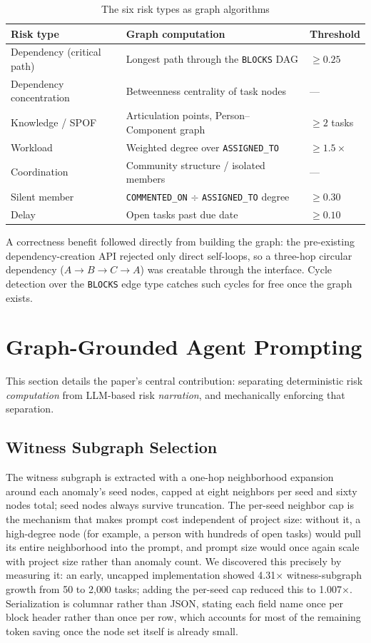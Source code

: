\documentclass[conference]{IEEEtran}
\begin{document}
\begin{table}[t]
\caption{The six risk types as graph algorithms}
\label{tab:risks}
\centering
\begin{tabular}{p{2.0cm}p{4.0cm}p{1.5cm}}
\toprule
\textbf{Risk type} & \textbf{Graph computation} & \textbf{Threshold} \\
\midrule
Dependency (critical path) & Longest path through the \texttt{BLOCKS} DAG & $\geq 0.25$ \\
Dependency concentration & Betweenness centrality of task nodes & --- \\
Knowledge / SPOF & Articulation points, Person--Component graph & $\geq 2$ tasks \\
Workload & Weighted degree over \texttt{ASSIGNED\_TO} & $\geq 1.5\times$ \\
Coordination & Community structure / isolated members & --- \\
Silent member & \texttt{COMMENTED\_ON} $\div$ \texttt{ASSIGNED\_TO} degree & $\geq 0.30$ \\
Delay & Open tasks past due date & $\geq 0.10$ \\
\bottomrule
\end{tabular}
\end{table}

A correctness benefit followed directly from building the graph: the pre-existing
dependency-creation API rejected only direct self-loops, so a three-hop circular
dependency ($A \to B \to C \to A$) was creatable through the interface. Cycle
detection over the \texttt{BLOCKS} edge type catches such cycles for free once the
graph exists.

\section{Graph-Grounded Agent Prompting}

This section details the paper's central contribution: separating deterministic risk
\emph{computation} from LLM-based risk \emph{narration}, and mechanically enforcing
that separation.

\subsection{Witness Subgraph Selection}

The witness subgraph is extracted with a one-hop neighborhood expansion around each
anomaly's seed nodes, capped at eight neighbors per seed and sixty nodes total; seed
nodes always survive truncation. The per-seed neighbor cap is the mechanism that
makes prompt cost independent of project size: without it, a high-degree node (for
example, a person with hundreds of open tasks) would pull its entire neighborhood
into the prompt, and prompt size would once again scale with project size rather than
anomaly count. We discovered this precisely by measuring it: an early, uncapped
implementation showed 4.31$\times$ witness-subgraph growth from 50 to 2{,}000 tasks;
adding the per-seed cap reduced this to 1.007$\times$. Serialization is columnar
rather than JSON, stating each field name once per block header rather than once per
row, which accounts for most of the remaining token saving once the node set itself
is already small.
\end{document}
